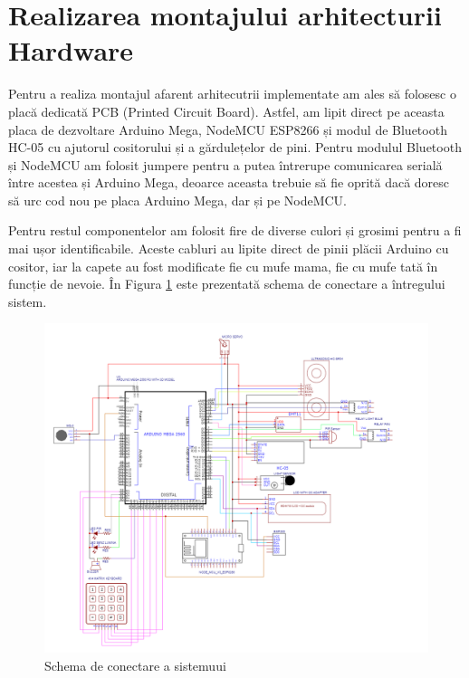 \section{Realizarea montajului arhitecturii Hardware}
Pentru a realiza montajul afarent arhitecutrii implementate am ales să folosesc o placă dedicată PCB (Printed Circuit Board). Astfel, am lipit direct pe aceasta placa de dezvoltare Arduino Mega, NodeMCU ESP8266 și modul de Bluetooth HC-05 cu ajutorul cositorului și a gărdulețelor de pini. Pentru modulul Bluetooth și NodeMCU am folosit jumpere pentru a putea întrerupe comunicarea serială între acestea și Arduino Mega, deoarce aceasta trebuie să fie oprită dacă doresc să urc cod nou pe placa Arduino Mega, dar și pe NodeMCU. 

Pentru restul componentelor am folosit fire de diverse culori și grosimi pentru a fi mai ușor identificabile. Aceste cabluri au lipite direct de pinii plăcii Arduino cu cositor, iar la capete au fost modificate fie cu mufe mama, fie cu mufe tată în funcție de nevoie. În Figura \ref{fig:sechema_full_sistem} este prezentată schema de conectare a întregului sistem.

\begin{figure}[H]
    \centering
    \includegraphics[width=1\linewidth]{bachelors_ro/images/sechema_full_sistem.png}
    \caption{Schema de conectare a sistemuui}
    \label{fig:sechema_full_sistem}
\end{figure}